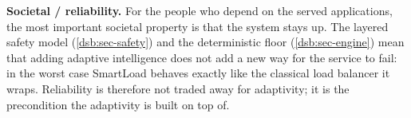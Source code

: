 \textbf{Societal / reliability.} For the people who depend on the served
applications, the most important societal property is that the system stays up.
The layered safety model (\cref{dsb:sec-safety}) and the deterministic floor
(\cref{dsb:sec-engine}) mean that adding adaptive intelligence does not add a new
way for the service to fail: in the worst case SmartLoad behaves exactly like the
classical load balancer it wraps. Reliability is therefore not traded away for
adaptivity; it is the precondition the adaptivity is built on top of.
